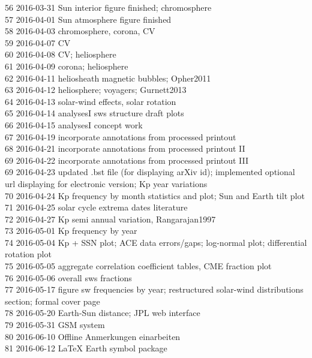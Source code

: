 \begin{footnotesize}
56	2016-03-31	Sun interior figure finished; chromosphere\\
57	2016-04-01	Sun atmosphere figure finished\\
58	2016-04-03	chromosphere, corona, CV\\
59	2016-04-07	CV\\
60	2016-04-08	CV; heliosphere\\
61	2016-04-09	corona; heliosphere\\
62	2016-04-11	heliosheath magnetic bubbles; Opher2011\\
63	2016-04-12	heliosphere; voyagers; Gurnett2013\\
64	2016-04-13	solar-wind effects, solar rotation\\
65	2016-04-14	analysesI sws structure draft plots\\
66	2016-04-15	analysesI concept work\\
67	2016-04-19	incorporate annotations from processed printout\\
68	2016-04-21	incorporate annotations from processed printout II\\
69	2016-04-22	incorporate annotations from processed printout III\\
69	2016-04-23	updated .bst file (for displaying arXiv id); implemented optional url displaying for electronic version; Kp year variations\\
70	2016-04-24	Kp frequency by month statistics and plot; Sun and Earth tilt plot\\
71	2016-04-25	solar cycle extrema dates literature\\
72	2016-04-27	Kp semi annual variation, Rangarajan1997\\
73	2016-05-01	Kp frequency by year\\
74	2016-05-04	Kp + SSN plot; ACE data errors/gaps; log-normal plot; differential rotation plot\\
75	2016-05-05	aggregate correlation coefficient tables, CME fraction plot\\
76	2016-05-06	overall sws fractions\\
77	2016-05-17	figure sw frequencies by year; restructured solar-wind distributions section; formal cover page\\
78	2016-05-20	Earth-Sun distance; JPL web interface\\
79	2016-05-31	GSM system\\
80	2016-06-10	Offline Anmerkungen einarbeiten\\
81	2016-06-12	LaTeX Earth symbol package\\

\end{footnotesize}
